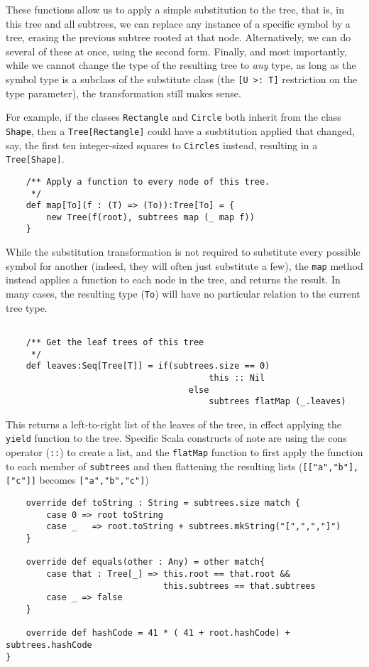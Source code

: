 
These functions allow us to apply a simple substitution to the tree, that
is, in this tree and all subtrees, we can replace any instance of a
specific symbol by a tree, erasing the previous subtree rooted at that
node. Alternatively, we can do several of these at once, using the second
form. Finally, and most importantly, while we cannot change the type of the
resulting tree to \emph{any} type, as long as the symbol type is a subclass
of the substitute class (the \texttt{[U >: T]} restriction on the type
parameter), the transformation still makes sense. 

For example, if the classes \texttt{Rectangle} and \texttt{Circle} both
inherit from the class \texttt{Shape}, then a \texttt{Tree[Rectangle]}
could have a susbtitution applied that changed, say, the first ten
integer-sized squares to \texttt{Circles} instead, resulting in a
\texttt{Tree[Shape]}.

\begin{verbatim}	
	/** Apply a function to every node of this tree.
	 */
	def map[To](f : (T) => (To)):Tree[To] = {
		new Tree(f(root), subtrees map (_ map f))
	}
\end{verbatim}

While the substitution transformation is not required to substitute every
possible symbol for another (indeed, they will often just substitute a
few), the \texttt{map} method instead applies a function to each node in
the tree, and returns the result. In many cases, the resulting type
(\texttt{To}) will have no particular relation to the current tree type.

\begin{verbatim}
	
	/** Get the leaf trees of this tree
	 */
	def leaves:Seq[Tree[T]] = if(subtrees.size == 0)
										this :: Nil 
									else
										subtrees flatMap (_.leaves)
\end{verbatim}

This returns a left-to-right list of the leaves of the tree, in effect
applying the \texttt{yield} function to the tree. Specific Scala constructs
of note are using the cons operator (\texttt{::}) to create a list, and
the \texttt{flatMap} function to first apply the function to each member of
\texttt{subtrees} and then flattening the resulting lists
(\texttt{[["a","b"],["c"]]} becomes \texttt{["a","b","c"]})

\begin{verbatim}
	override def toString : String = subtrees.size match { 
		case 0 => root toString
		case _   => root.toString + subtrees.mkString("[",",","]") 
	}

	override def equals(other : Any) = other match{
		case that : Tree[_] => this.root == that.root &&
							   this.subtrees == that.subtrees
		case _ => false
	}

	override def hashCode = 41 * ( 41 + root.hashCode) + subtrees.hashCode
}
\end{verbatim}

